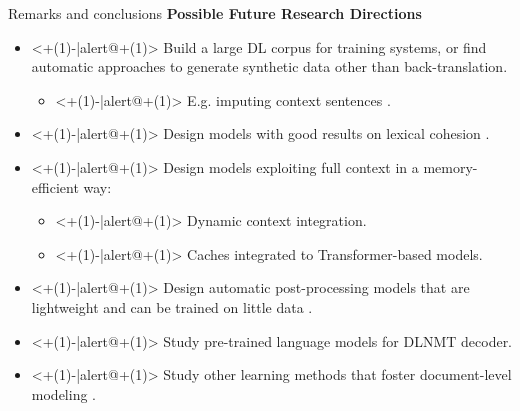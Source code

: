 \begin{frame}{Remarks and conclusions}
	\textbf{Possible Future Research Directions}
	\begin{itemize}
		\item<+(1)-|alert@+(1)> Build a large DL corpus for training systems, or find automatic approaches to generate synthetic data other than back-translation.
		\begin{itemize}
			\item<+(1)-|alert@+(1)> E.g. imputing context sentences \cite{jean_fill_2019}.
		\end{itemize}
		\item<+(1)-|alert@+(1)> Design models with good results on lexical cohesion \cite{voita_when_2019}.
		\item<+(1)-|alert@+(1)> Design models exploiting full context in a memory-efficient way:
		\begin{itemize}
			\item<+(1)-|alert@+(1)> Dynamic context integration.
			\item<+(1)-|alert@+(1)> Caches integrated to Transformer-based models.
		\end{itemize}
		\item<+(1)-|alert@+(1)> Design automatic post-processing models that are lightweight and can be trained on little data \cite{kim_when_2019}.
		\item<+(1)-|alert@+(1)> Study pre-trained language models for DLNMT decoder.
		\item<+(1)-|alert@+(1)> Study other learning methods that foster document-level modeling \cite{jean_context-aware_2019}.
	\end{itemize}
\end{frame}

%
%


